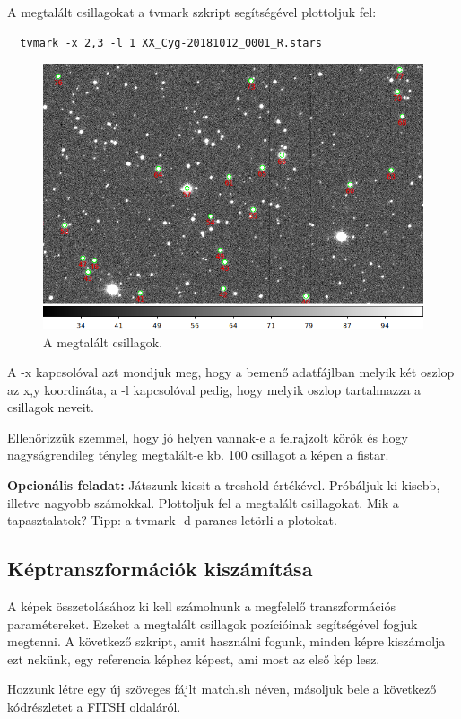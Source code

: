 \documentclass{article}
\begin{document}
A megtalált csillagokat a tvmark szkript segítségével plottoljuk fel:

\begin{verbatim}
  tvmark -x 2,3 -l 1 XX_Cyg-20181012_0001_R.stars
\end{verbatim}

\begin{figure}
    \centering
    \includegraphics[width=0.8\linewidth]{pics/tvmark.png}
    \caption{A megtalált csillagok.}
    \label{stars}
\end{figure}

A -x kapcsolóval azt mondjuk meg, hogy a bemenő adatfájlban melyik két oszlop
az x,y koordináta, a -l kapcsolóval pedig, hogy melyik oszlop tartalmazza a
csillagok neveit.

Ellenőrizzük szemmel, hogy jó helyen vannak-e a felrajzolt körök és hogy
nagyságrendileg tényleg megtalált-e kb. 100 csillagot a képen a fistar.

{\bf Opcionális feladat:}
Játszunk kicsit a treshold értékével. Próbáljuk ki kisebb, illetve nagyobb
számokkal. Plottoljuk fel a megtalált csillagokat. Mik a tapasztalatok?
Tipp: a tvmark -d parancs letörli a plotokat.

\subsection{Képtranszformációk kiszámítása}

A képek összetolásához ki kell számolnunk a megfelelő transzformációs
paramétereket. Ezeket a megtalált csillagok pozícióinak segítségével fogjuk
megtenni. A következő szkript, amit használni fogunk, minden képre kiszámolja
ezt nekünk, egy referencia képhez képest, ami most az első kép lesz.

Hozzunk létre egy új szöveges fájlt match.sh néven, másoljuk bele a következő
kódrészletet a FITSH oldaláról.
\end{document}
